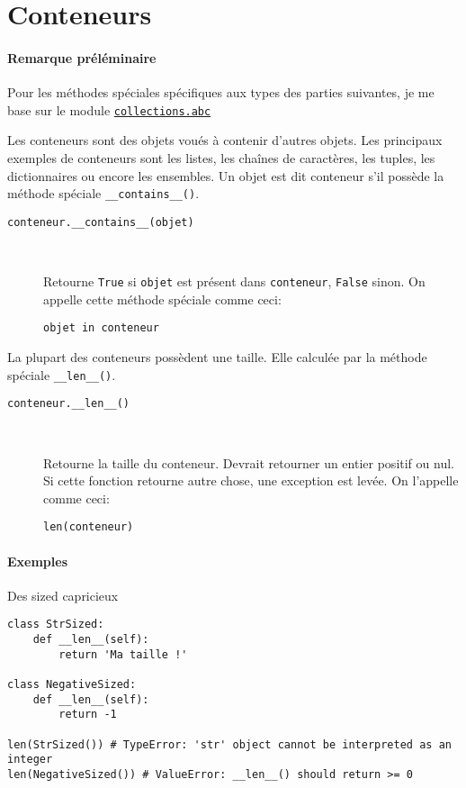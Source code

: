 \section{Conteneurs}

\paragraph{Remarque préléminaire} Pour les méthodes spéciales spécifiques aux types des parties suivantes, je me base sur le module \hyperref[abc]{\texttt{collections.abc}}\medskip


Les conteneurs sont des objets voués à contenir d'autres objets. Les principaux exemples de conteneurs sont les listes, les chaînes de caractères, les tuples, les dictionnaires ou encore les ensembles. Un objet est dit conteneur s'il possède la méthode spéciale \texttt{__contains__()}.

\begin{description}
    \item[\texttt{conteneur.__contains__(objet)}]~

    Retourne \texttt{True} si \texttt{objet} est présent dans \texttt{conteneur}, \texttt{False} sinon. On appelle cette méthode spéciale comme ceci:
    \begin{verbatim}
objet in conteneur
    \end{verbatim}
\end{description}

La plupart des conteneurs possèdent une taille. Elle calculée par la méthode spéciale \texttt{__len__()}.
\begin{description}
    \item[\texttt{conteneur.__len__()}]~

    Retourne la taille du conteneur. Devrait retourner un entier positif ou nul. Si cette fonction retourne autre chose, une exception est levée. On l'appelle comme ceci:
    \begin{verbatim}
len(conteneur)
    \end{verbatim}
\end{description}
\paragraph{Exemples} Des \og sized \fg{} capricieux
\begin{verbatim}
class StrSized:
    def __len__(self):
        return 'Ma taille !'

class NegativeSized:
    def __len__(self):
        return -1

len(StrSized()) # TypeError: 'str' object cannot be interpreted as an integer
len(NegativeSized()) # ValueError: __len__() should return >= 0
\end{verbatim}


